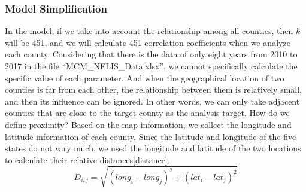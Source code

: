 \documentclass{mcmthesis}
\begin{document}
\subsubsection{Model Simplification}
In the model, if we take into account the relationship among all counties, then $k$ will be 451, and we will calculate 451 correlation coefficients when we analyze each county. Considering that there is the data of only eight years from 2010 to 2017 in the file ``MCM\_NFLIS\_Data.xlsx'', we cannot specifically calculate the specific value of each parameter. And when the geographical location of two counties is far from each other, the relationship between them is relatively small, and then its influence can be ignored. In other words, we can only take adjacent counties that are close to the target county as the analysis target. How do we define proximity? Based on the map information, we collect the longitude and latitude information of each county. Since the latitude and longitude of the five states do not vary much, we used the longitude and latitude of the two locations to calculate their relative distances\eqref{distance}.
\begin{equation}
D_{i,j} = \sqrt{(long_i-long_j)^2+(lat_i-lat_j)^2}
\label{distance}
\end{equation}
\end{document}

